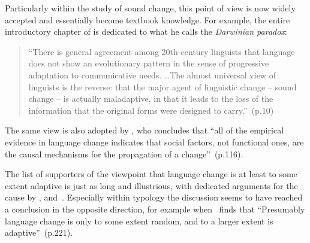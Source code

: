 Particularly within the study of sound change, this point of view is now widely accepted and essentially become textbook knowledge. For example, the entire introductory chapter of \citet{Labov2001} is dedicated to what he calls the \emph{Darwinian paradox}: 

\begin{quote}
``There is general agreement among 20th-century linguists that language does not show an evolutionary pattern in the sense of progressive adaptation to communicative needs. \ldots The almost universal view of linguists is the reverse: that the major agent of linguistic change -- sound change -- is actually maladaptive, in that it leads to the loss of the information that the original forms were designed to carry.''~(p.10)
\end{quote}


The same view is also adopted by \citet{Croft2006}, who concludes that ``all of the empirical evidence in language change indicates that social factors, not functional ones, are the causal mechanisms for the propagation of a change''~(p.116).

The list of supporters of the viewpoint that language change is at least to some extent adaptive is just as long and illustrious, with dedicated arguments for the cause by \citet{Jespersen1949}, \citet{Vennemann1993} and~\citet{Haspelmath1999,Haspelmath2008}.
Especially within typology the discussion seems to have reached a conclusion in the opposite direction, for example when~\citet{Wichmann2015} finds that ``Presumably language change is only to some extent random, and to a larger extent is adaptive''~(p.221).



